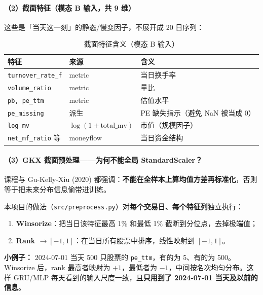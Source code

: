 \documentclass[UTF8,a4paper,12pt]{ctexart}
\begin{document}
\paragraph{（2）截面特征（模态 B 输入，共 9 维）}

这些是「当天这一刻」的静态/慢变因子，不展开成 20 日序列：

\begin{table}[H]
\centering
\caption{截面特征含义（模态 B 输入）}
\label{tab:tab-feat}
\small
\begin{tabular}{llp{6.5cm}}
\toprule
\textbf{特征} & \textbf{来源} & \textbf{含义} \\
\midrule
\texttt{turnover\_rate\_f} & metric & 当日换手率 \\
\texttt{volume\_ratio}     & metric & 量比 \\
\texttt{pb, pe\_ttm}       & metric & 估值水平 \\
\texttt{pe\_missing}       & 派生 & PE 缺失指示（避免 NaN 被当成 0） \\
\texttt{log\_mv}           & $\log(1+\text{total\_mv})$ & 市值（规模因子） \\
\texttt{net\_mf\_ratio} 等 & moneyflow & 当日资金结构 \\
\bottomrule
\end{tabular}
\end{table}

\paragraph{（3）GKX 截面预处理——为何不能全局 StandardScaler？}

课程与 Gu-Kelly-Xiu (2020) 都强调：\textbf{不能在全样本上算均值方差再标准化}，否则等于把未来分布信息偷带进训练。

本项目的做法（\texttt{src/preprocess.py}）对\textbf{每个交易日、每个特征列}独立执行：
\begin{enumerate}[leftmargin=2em]
  \item \textbf{Winsorize}：把当日该特征最高 1\% 和最低 1\% 截断到分位点，去掉极端值；
  \item \textbf{Rank $\to [-1,1]$}：在当日所有股票中排序，线性映射到 $[-1,1]$。
\end{enumerate}

\textbf{小例子：} 2024-07-01 当天 500 只股票的 \texttt{pe\_ttm}，有的为 5、有的为 500。Winsorize 后，rank 最高者映射为 $+1$，最低者为 $-1$，中间按名次均匀分布。这样 GRU/MLP 每天看到的输入尺度一致，且\textbf{只用到了 2024-07-01 当天及以前的信息}。
\end{document}
